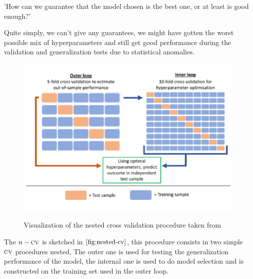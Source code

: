 \medskip

'How can we guarantee that the model chosen is the best one, or at least is good enough?'

\smallskip

Quite simply, we can't give any guarantees, we might have gotten the worst possible mix of
hyperparameters and still get good performance during the validation and generalization tests due to
statistical anomalies.

\begin{figure}
	\centering
	\includegraphics[scale=.3]{./img/nested-cv.png}
	\label{fig:nested-cv}
	\caption{Visualization of the nested cross validation procedure taken from \cite{pain2020}}
\end{figure}

The $n-\textsc{cv}$ is sketched in $\Cref{fig:nested-cv}$, this procedure consists in two simple $\textsc{cv}$
procedures nested, The outer one is used for testing the generalization performance of the model,
the internal one is used to do model selection and is constructed on the training set used in the
outer loop.

